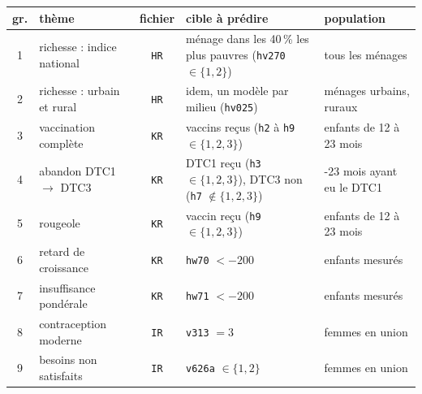 \documentclass[11pt]{article}
\begin{document}
\begin{center}
  \footnotesize\renewcommand{\arraystretch}{1.15}\setlength\tabcolsep{4pt}
  \begin{tabular}{clc>{\raggedright\arraybackslash}p{}>{\raggedright\arraybackslash}p{}}
    \toprule
    \textbf{gr.} & \textbf{thème} & \textbf{fichier} & \textbf{cible à prédire} & \textbf{population} \\
    \midrule
    1 & richesse : indice national & \texttt{HR} & ménage dans les 40\,\% les plus pauvres (\texttt{hv270} $\in\{1,2\}$) & tous les ménages \\
    2 & richesse : urbain et rural & \texttt{HR} & idem, un modèle par milieu (\texttt{hv025}) & ménages urbains, ruraux \\
    3 & vaccination complète & \texttt{KR} & 8 vaccins reçus (\texttt{h2} à \texttt{h9} $\in\{1,2,3\}$) & enfants de 12 à 23 mois \\
    4 & abandon DTC1 $\to$ DTC3 & \texttt{KR} & DTC1 reçu (\texttt{h3} $\in\{1,2,3\}$), DTC3 non (\texttt{h7} $\notin\{1,2,3\}$) & 12-23 mois ayant eu le DTC1 \\
    5 & rougeole & \texttt{KR} & vaccin reçu (\texttt{h9} $\in\{1,2,3\}$) & enfants de 12 à 23 mois \\
    6 & retard de croissance & \texttt{KR} & \texttt{hw70} $<-200$ & enfants mesurés \\
    7 & insuffisance pondérale & \texttt{KR} & \texttt{hw71} $<-200$ & enfants mesurés \\
    8 & contraception moderne & \texttt{IR} & \texttt{v313} $=3$ & femmes en union \\
    9 & besoins non satisfaits & \texttt{IR} & \texttt{v626a} $\in\{1,2\}$ & femmes en union \\
    \bottomrule
  \end{tabular}
\end{center}
\end{document}
